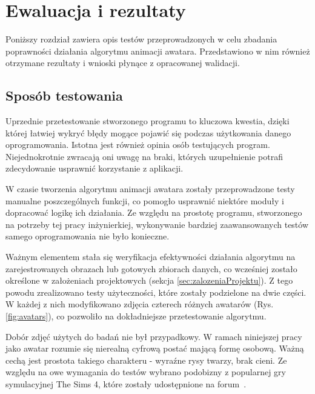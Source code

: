 \chapter{Ewaluacja i rezultaty}
\label{cha:ewaluacjaIRezultaty}
Poniższy rozdział zawiera opis testów przeprowadzonych w celu zbadania poprawności działania algorytmu animacji awatara. Przedstawiono w nim również otrzymane rezultaty i wnioski płynące z opracowanej walidacji.


\section{Sposób testowania}
Uprzednie przetestowanie stworzonego programu to kluczowa kwestia, dzięki której łatwiej wykryć błędy mogące pojawić się podczas użytkowania danego oprogramowania. Istotna jest również opinia osób testujących program. Niejednokrotnie zwracają oni uwagę na braki, których uzupełnienie potrafi zdecydowanie usprawnić korzystanie z aplikacji.

W czasie tworzenia algorytmu animacji awatara zostały przeprowadzone testy manualne poszczególnych funkcji, co pomogło usprawnić niektóre moduły i dopracować logikę ich działania. Ze względu na prostotę programu, stworzonego na potrzeby tej pracy inżynierkiej, wykonywanie bardziej zaawansowanych testów samego oprogramowania nie było konieczne.

Ważnym elementem stała się weryfikacja efektywności działania algorytmu na zarejestrowanych obrazach lub gotowych zbiorach danych, co wcześniej zostało określone w założeniach projektowych (sekcja \ref{sec:zalozeniaProjektu}). Z tego powodu zrealizowano testy użyteczności, które zostały podzielone na dwie części. W każdej z nich modyfikowano zdjęcia czterech różnych awatarów (Rys. \ref{fig:avatars}), co pozwoliło na dokładniejsze przetestowanie algorytmu.

Dobór zdjęć użytych do badań nie był przypadkowy. W ramach niniejszej pracy jako awatar rozumie się nierealną cyfrową postać mającą formę osobową. Ważną cechą jest prostota takiego charakteru - wyraźne rysy twarzy, brak cieni. Ze względu na owe wymagania do testów wybrano podobizny z popularnej gry symulacyjnej The Sims 4, które zostały udostępnione na forum~\cite{avatars}.

